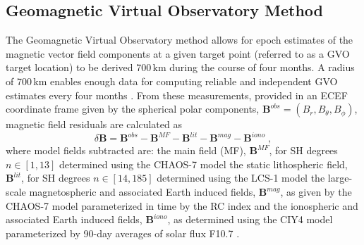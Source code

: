 \documentclass[extra,mreferee]{gji}
\begin{document}
\subsection{Geomagnetic Virtual Observatory Method}
\label{sec:4.1}
The Geomagnetic Virtual Observatory method allows for epoch estimates of the magnetic vector field components at a given target point (referred to as a GVO target location) to be derived  700\,km during the course of four months. A radius of 700\,km enables enough data for computing reliable and independent GVO estimates every four months \citep{Hammer_2018}. From these measurements, provided in an ECEF coordinate frame given by the spherical polar components, $\mathbf{B}^{obs}=(B_r,B_{\theta},B_{\phi})$, magnetic field residuals are calculated as \citep{Hammer_etal_2021a}
\begin{equation}
\delta \mathbf{B} = \mathbf{B}^{obs} - \mathbf{B}^{MF} -\mathbf{B}^{lit}- \mathbf{B}^{mag}- \mathbf{B}^{iono} \;,  \label{eq:mag_res}
\end{equation}
where model fields subtracted are: the main field (MF), $\mathbf{B}^{MF}$, for SH degrees $n \in [1,13]$ determined using the CHAOS-7 model  \cite{Finlay_etal_2020}\replaced{;}{,} the static lithospheric field, $\mathbf{B}^{lit}$, for SH degrees $n \in [14,185]$ determined using the LCS-1 model \citep{Olsen_etal_2017}\replaced{;}{,} the large-scale magnetospheric and associated Earth induced fields, $\mathbf{B}^{mag}$, as given by the CHAOS-7 model parameterized in time by the RC index \citep{Finlay_etal_2020}\replaced{;}{,} and the ionospheric and associated Earth induced fields, $\mathbf{B}^{iono}$, as determined using the CIY4 model parameterized by 90-day averages of solar flux F10.7 \citep{Sabaka_etal_2018}. 
\end{document}
